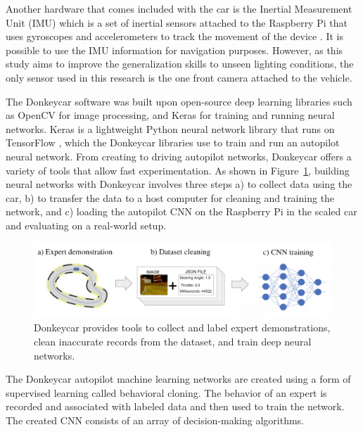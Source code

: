 \documentclass[12pt]{article}
\begin{document}
Another hardware that comes included with the car is the Inertial Measurement Unit (IMU) which is a set of inertial sensors attached to the Raspberry Pi that uses gyroscopes and accelerometers to track the movement of the device \parencite{Santiago}. It is possible to use the IMU information for navigation purposes. However, as this study aims to improve the generalization skills to unseen lighting conditions,  the only sensor used in this research is the one front camera attached to the vehicle.

The Donkeycar software was built upon open-source deep learning libraries such as OpenCV \parencite{opencv} for image processing, and Keras \parencite{keras} for training and running neural networks. Keras is a lightweight Python neural network library that runs on TensorFlow \parencite{tensor}, which the Donkeycar libraries use to train and run an autopilot neural network. From creating to driving autopilot networks, Donkeycar offers a variety of tools that allow fast experimentation. As shown in Figure~\ref{fig:cloning}, building neural networks with Donkeycar involves three steps a) to collect data using the car, b) to transfer the data to a host computer for cleaning and training the network, and c) loading the autopilot CNN on the Raspberry Pi in the scaled car and evaluating on a real-world setup.

\begin{figure} [!ht] %
\begin{center}
\includegraphics[width=1.0\textwidth]{figures/behaviorcloning.png}
\caption{ Donkeycar provides tools to collect and label expert demonstrations, clean inaccurate records from the dataset, and train deep neural networks.}
\label{fig:cloning}
\end{center}
\end{figure}

The Donkeycar autopilot machine learning networks are created using a form of supervised learning called behavioral cloning. The behavior of an expert is recorded and associated with labeled data and then used to train the network. The created CNN consists of an array of decision-making algorithms.
\end{document}
